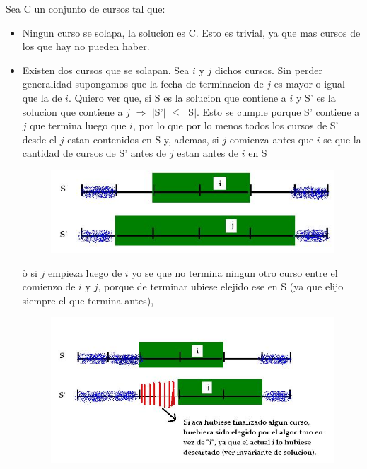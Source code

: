 Sea C un conjunto de cursos tal que:
\begin{itemize}
\item Ningun curso se solapa, la solucion es C. Esto es trivial, ya que mas cursos de los que hay no pueden  haber.
\item Existen dos cursos que se solapan. Sea $i$ y $j$ dichos cursos. Sin perder generalidad supongamos que la fecha de terminacion de $j$ es mayor o igual que la de $i$. Quiero ver que, si S es la solucion que contiene a $i$ y S' es la solucion que contiene a $j$ $\Rightarrow$ $|$S'$|$ $\leq$ $|$S$|$. 
  Esto se cumple porque S' contiene a $j$ que termina luego que $i$, por lo que por lo menos todos los cursos de S' desde el $j$ estan contenidos en S y, ademas, si  $j$ comienza antes que $i$ se que la cantidad de cursos de S' antes de $j$ estan antes de $i$ en S 

\begin{figure}[H] %
\begin{center}
\includegraphics[width=322pt]{../imgs/demo21.jpg}
\end{center}
\end{figure}

ò si $j$ empieza luego de $i$ yo se que no termina ningun otro curso entre el comienzo de $i$ y $j$, porque de terminar ubiese elejido ese en S  (ya que elijo siempre el que termina antes), 

\begin{figure}[H] %
\begin{center}
\includegraphics[width=322pt]{../imgs/demo22.jpg}
\end{center}
\end{figure}

\end{itemize}

